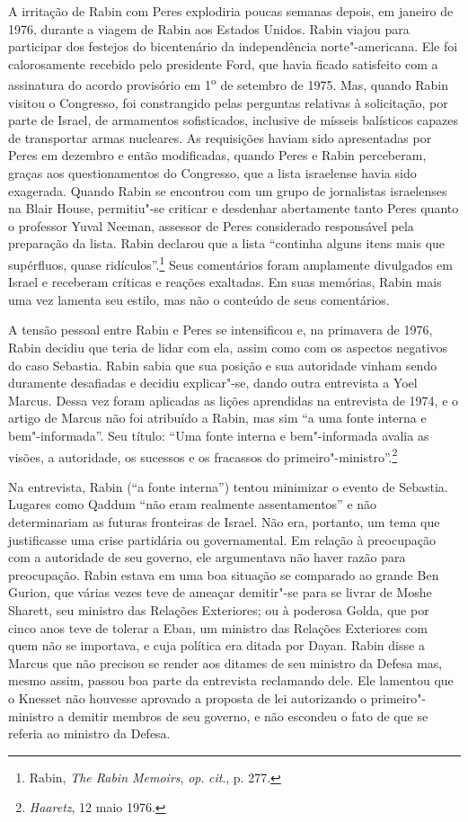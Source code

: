 A irritação de Rabin com Peres explodiria poucas semanas depois, em
janeiro de 1976, durante a viagem de Rabin aos Estados Unidos. Rabin
viajou para participar dos festejos do bicentenário da independência
norte"-americana. Ele foi calorosamente recebido pelo presidente Ford,
que havia ficado satisfeito com a assinatura do acordo provisório
em 1\textsuperscript{o} de setembro de 1975. Mas, quando Rabin
visitou o Congresso, foi constrangido pelas perguntas relativas à
solicitação, por parte de Israel, de armamentos sofisticados, inclusive
de mísseis balísticos capazes de transportar armas nucleares. As
requisições haviam sido apresentadas por Peres em dezembro e então
modificadas, quando Peres e Rabin perceberam, graças aos questionamentos
do Congresso, que a lista israelense havia sido exagerada. Quando Rabin
se encontrou com um grupo de jornalistas israelenses na Blair House,
permitiu"-se criticar e desdenhar abertamente tanto Peres quanto o
professor Yuval Neeman, assessor de Peres considerado responsável pela
preparação da lista. Rabin declarou que a lista ``continha alguns itens
mais que supérfluos, quase ridículos''.\footnote{Rabin,
\textit{The Rabin Memoirs}, \textit{op}. \textit{cit}., p. 277.} Seus comentários
foram amplamente divulgados em Israel e receberam críticas e reações
exaltadas. Em suas memórias, Rabin mais uma vez lamenta seu estilo, mas
não o conteúdo de seus comentários.

A tensão pessoal entre Rabin e Peres se intensificou e, na primavera de
1976, Rabin decidiu que teria de lidar com ela, assim como com os
aspectos negativos do caso Sebastia. Rabin sabia que sua posição e sua
autoridade vinham sendo duramente desafiadas e decidiu explicar"-se, dando
outra entrevista a Yoel Marcus. Dessa vez foram aplicadas as lições
aprendidas na entrevista de 1974, e o artigo de Marcus não foi atribuído
a Rabin, mas sim ``a uma fonte interna e bem"-informada''. Seu título:
``Uma fonte interna e bem"-informada avalia as visões, a autoridade, os
sucessos e os fracassos do primeiro"-ministro''.\footnote{\textit{Haaretz}, 12 maio 1976.}

Na entrevista, Rabin (``a fonte interna'') tentou minimizar o evento
de Sebastia. Lugares como Qaddum ``não eram realmente assentamentos'' e
não determinariam as futuras fronteiras de Israel. Não era, portanto, um
tema que justificasse uma crise partidária ou governamental. Em relação
à preocupação com a autoridade de seu governo, ele argumentava não haver
razão para preocupação. Rabin estava em uma boa situação se
comparado ao grande Ben Gurion, que várias vezes teve de ameaçar
demitir"-se para se livrar de Moshe Sharett, seu ministro das Relações
Exteriores; ou à poderosa Golda, que por cinco anos teve de tolerar a
Eban, um ministro das Relações Exteriores com quem não se importava, e
cuja política era ditada por Dayan. Rabin disse a Marcus que não precisou
se render aos ditames de seu ministro da Defesa mas, mesmo assim,
passou boa parte da entrevista reclamando dele. Ele lamentou que o
Knesset não houvesse aprovado a proposta de lei autorizando o primeiro"-ministro
a demitir membros de seu governo, e não escondeu o fato de que
se referia ao ministro da Defesa.

